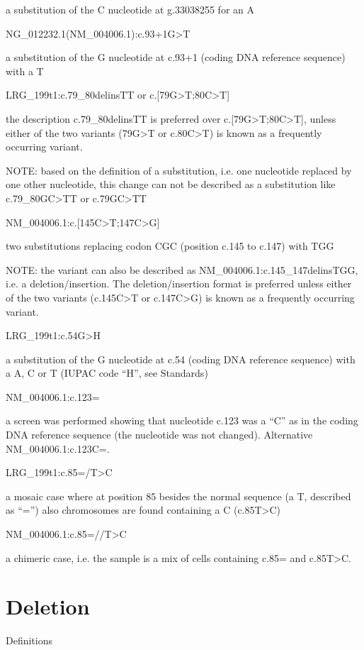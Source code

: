 \documentclass{book}
\begin{document}
	a substitution of the C nucleotide at g.33038255 for an A

	NG\_012232.1(NM\_004006.1):c.93+1G>T

	a substitution of the G nucleotide at c.93+1 (coding DNA reference sequence) with a T

	LRG\_199t1:c.79\_80delinsTT or c.[79G>T;80C>T]

	the description c.79\_80delinsTT is preferred over c.[79G>T;80C>T], unless either of the two variants (79G>T or c.80C>T) is known as a frequently occurring variant.

	NOTE: based on the definition of a substitution, i.e. one nucleotide replaced by one other nucleotide, this change can not be described as a substitution like c.79\_80GC>TT or c.79GC>TT

	NM\_004006.1:c.[145C>T;147C>G]

	two substitutions replacing codon CGC (position c.145 to c.147) with TGG

	NOTE: the variant can also be described as NM\_004006.1:c.145\_147delinsTGG, i.e. a deletion/insertion. The deletion/insertion format is preferred unless either of the two variants (c.145C>T or c.147C>G) is known as a frequently occurring variant.

	LRG\_199t1:c.54G>H

	a substitution of the G nucleotide at c.54 (coding DNA reference sequence) with a A, C or T (IUPAC code “H”, see Standards)

	NM\_004006.1:c.123=

	a screen was performed showing that nucleotide c.123 was a “C” as in the coding DNA reference sequence (the nucleotide was not changed). Alternative NM\_004006.1:c.123C=.

	LRG\_199t1:c.85=/T>C

	a mosaic case where at position 85 besides the normal sequence (a T, described as “=”) also chromosomes are found containing a C (c.85T>C)

	NM\_004006.1:c.85=//T>C

	a chimeric case, i.e. the sample is a mix of cells containing c.85= and c.85T>C.

	

	\section{Deletion}

	

	Definitions
\end{document}
